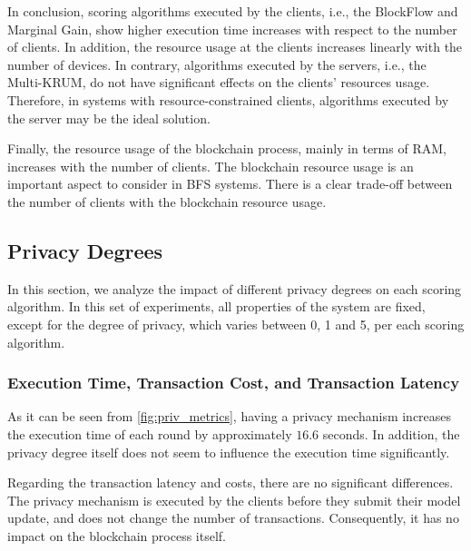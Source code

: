 In conclusion, scoring algorithms executed by the clients, i.e., the BlockFlow and Marginal Gain, show higher execution time increases with respect to the number of clients. In addition, the resource usage at the clients increases linearly with the number of devices. In contrary, algorithms executed by the servers, i.e., the Multi-KRUM, do not have significant effects on the clients' resources usage. Therefore, in systems with resource-constrained clients, algorithms executed by the server may be the ideal solution.

Finally, the resource usage of the blockchain process, mainly in terms of RAM, increases with the number of clients. The blockchain resource usage is an important aspect to consider in BFS systems. There is a clear trade-off between the number of clients with the blockchain resource usage.

\subsection{Privacy Degrees}

In this section, we analyze the impact of different privacy degrees on each scoring algorithm. In this set of experiments, all properties of the system are fixed, except for the degree of privacy, which varies between 0, 1 and 5, per each scoring algorithm.

\subsubsection{Execution Time, Transaction Cost, and Transaction Latency}

As it can be seen from \autoref{fig:priv_metrics}, having a privacy mechanism increases the execution time of each round by approximately $16.6$ seconds. In addition, the privacy degree itself does not seem to influence the execution time significantly.

Regarding the transaction latency and costs, there are no significant differences. The privacy mechanism is executed by the clients before they submit their model update, and does not change the number of transactions. Consequently, it has no impact on the blockchain process itself.

